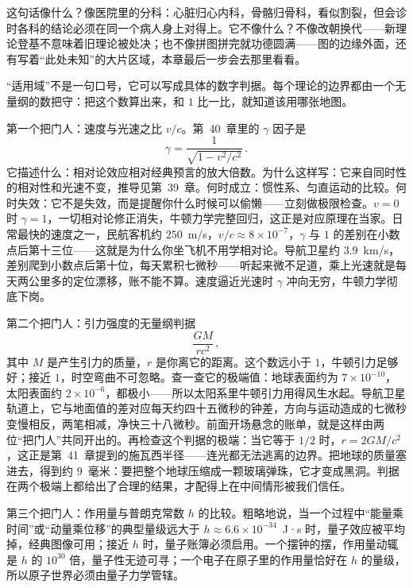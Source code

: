 这句话像什么？像医院里的分科：心脏归心内科，骨骼归骨科，看似割裂，但会诊时各科的结论必须在同一个病人身上对得上。它不像什么？不像改朝换代——新理论登基不意味着旧理论被处决；也不像拼图拼完就功德圆满——图的边缘外面，还有写着“此处未知”的大片区域，本章最后一步会去那里看看。


“适用域”不是一句口号，它可以写成具体的数字判据。每个理论的边界都由一个无量纲的数把守：把这个数算出来，和 $1$ 比一比，就知道该用哪张地图。

第一个把门人：速度与光速之比 $v/c$。第~40~章里的 $\gamma$ 因子是
\[
\gamma=\frac{1}{\sqrt{1-v^{2}/c^{2}}}\, .
\]
它描述什么：相对论效应相对经典预言的放大倍数。为什么这样写：它来自同时性的相对性和光速不变，推导见第~39~章。何时成立：惯性系、匀直运动的比较。何时失效：它不是失效，而是提醒你什么时候可以偷懒——立刻做极限检查。$v=0$ 时 $\gamma=1$，一切相对论修正消失，牛顿力学完整回归，这正是对应原理在当家。日常最快的速度之一，民航客机约 $250$~m/s，$v/c\approx8\times10^{-7}$，$\gamma$ 与 $1$ 的差别在小数点后第十三位——这就是为什么你坐飞机不用学相对论。导航卫星约 $3.9$~km/s，差别爬到小数点后第十位，每天累积七微秒——听起来微不足道，乘上光速就是每天两公里多的定位漂移，账不能不算。速度逼近光速时 $\gamma$ 冲向无穷，牛顿力学彻底下岗。

第二个把门人：引力强度的无量纲判据
\[
\frac{GM}{rc^{2}}\, ,
\]
其中 $M$ 是产生引力的质量，$r$ 是你离它的距离。这个数远小于 $1$，牛顿引力足够好；接近 $1$，时空弯曲不可忽略。查一查它的极端值：地球表面约为 $7\times10^{-10}$，太阳表面约 $2\times10^{-6}$，都极小——所以太阳系里牛顿引力用得风生水起。导航卫星轨道上，它与地面值的差对应每天约四十五微秒的钟差，方向与运动造成的七微秒变慢相反，两笔相减，净快三十八微秒。前面开场悬念的账单，就是这样由两位“把门人”共同开出的。再检查这个判据的极端：当它等于 $1/2$ 时，$r=2GM/c^{2}$，这正是第~41~章提到的施瓦西半径——连光都无法逃离的边界。把地球的质量塞进去，得到约 $9$~毫米：要把整个地球压缩成一颗玻璃弹珠，它才变成黑洞。判据在两个极端上都给出了合理的结果，才配得上在中间情形被我们信任。

第三个把门人：作用量与普朗克常数 $h$ 的比较。粗略地说，当一个过程中“能量乘时间”或“动量乘位移”的典型量级远大于 $h\approx6.6\times10^{-34}$~J·s 时，量子效应被平均掉，经典图像可用；接近 $h$ 时，量子账簿必须启用。一个摆钟的摆，作用量动辄是 $h$ 的 $10^{30}$ 倍，量子性无迹可寻；一个电子在原子里的作用量恰好在 $h$ 的量级，所以原子世界必须由量子力学管辖。

